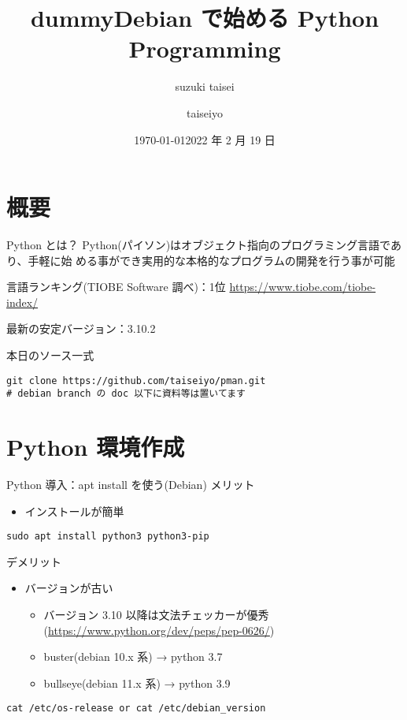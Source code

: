 \documentclass[compress,dvipdfmx,11pt]{beamer}
\author{suzuki taisei}
\date{\today}
\title{dummy}
\title[2022 年度 2 月 Debian 勉強会]{\bf Debian で始める Python Programming}
\author[]{taiseiyo}
\date{2022 年 2 月 19 日}
\begin{document}
\maketitle
\newcommand{\pivec}{\mathbf \pi}
\newcommand{\xvec}{\mathbf x}
\newcommand{\yvec}{\mathbf y}
\newcommand{\zvec}{\mathbf z}
\newcommand{\Emat}{\mathbf E}
\newcommand{\Imat}{\mathbf I}

\section{概要}
\label{sec:orgbcf19ca}
\begin{frame}[label={sec:orgc7a21b0},fragile]{Python とは？}
 Python(パイソン)はオブジェクト指向のプログラミング言語であり、手軽に始
める事ができ実用的な本格的なプログラムの開発を行う事が可能


言語ランキング(TIOBE Software 調べ)：1位
\url{https://www.tiobe.com/tiobe-index/}


最新の安定バージョン：3.10.2



本日のソース一式
\begin{verbatim}
git clone https://github.com/taiseiyo/pman.git
# debian branch の doc 以下に資料等は置いてます
\end{verbatim}
\end{frame}

\section{Python 環境作成}
\label{sec:orgccdeb06}
\begin{frame}[label={sec:org1d73ee1},fragile]{Python 導入：apt install を使う(Debian)}
 メリット
\begin{itemize}
\item インストールが簡単
\end{itemize}
\begin{verbatim}
sudo apt install python3 python3-pip
\end{verbatim}

デメリット
\begin{itemize}
\item バージョンが古い
\begin{itemize}
\item バージョン 3.10 以降は文法チェッカーが優秀(\url{https://www.python.org/dev/peps/pep-0626/})
\item buster(debian 10.x 系) → python 3.7
\item bullseye(debian 11.x 系) → python 3.9
\end{itemize}
\end{itemize}


\vspace{-2truemm}      
\begin{verbatim}
cat /etc/os-release or cat /etc/debian_version
\end{verbatim}
\end{frame}
\end{document}
